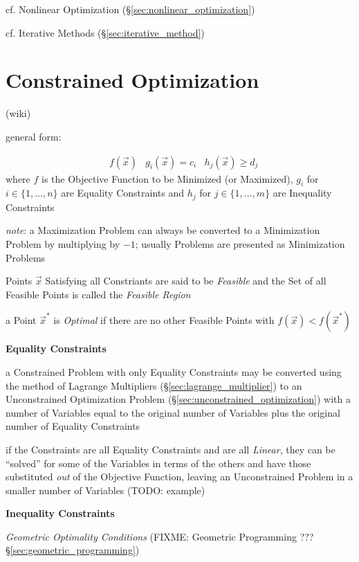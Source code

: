 \fist cf. Nonlinear Optimization (\S\ref{sec:nonlinear_optimization})

\fist cf. Iterative Methods (\S\ref{sec:iterative_method})



\section{Constrained Optimization}\label{sec:constrained_optimization}

(wiki)

general form:

\begin{align*}
  & f(\vec{x})
  & g_i(\vec{x}) = c_i
  & h_j(\vec{x}) \geq d_j
\end{align*}
where $f$ is the Objective Function to be Minimized (or Maximized), $g_i$ for
$i \in \{ 1, \ldots, n \}$ are Equality Constraints and $h_j$ for $j \in \{ 1,
\ldots, m \}$ are Inequality Constraints

\emph{note}: a Maximization Problem can always be converted to a Minimization
Problem by multiplying by $-1$; usually Problems are presented as Minimization
Problems

Points $\vec{x}$ Satisfying all Constriants are said to be \emph{Feasible}
and the Set of all Feasible Points is called the \emph{Feasible Region}

a Point $\vec{x}^*$ is \emph{Optimal} if there are no other Feasible Points
with $f(\vec{x}) < f(\vec{x}^*)$


\textbf{Equality Constraints}

a Constrained Problem with only Equality Constraints may be converted using the
method of Lagrange Multipliers (\S\ref{sec:lagrange_multiplier}) to an
Unconstrained Optimization Problem (\S\ref{sec:unconstrained_optimization})
with a number of Variables equal to the original number of Variables plus the
original number of Equality Constraints

if the Constraints are all Equality Constraints and are all \emph{Linear}, they
can be ``solved'' for some of the Variables in terms of the others and have
those substituted \emph{out} of the Objective Function, leaving an
Unconstrained Problem in a smaller number of Variables (TODO: example)


\textbf{Inequality Constraints}

\emph{Geometric Optimality Conditions} (FIXME: Geometric Programming ???
\S\ref{sec:geometric_programming})

